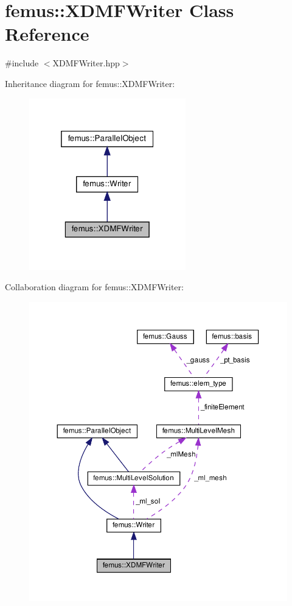\hypertarget{classfemus_1_1_x_d_m_f_writer}{}\section{femus\+:\+:X\+D\+M\+F\+Writer Class Reference}
\label{classfemus_1_1_x_d_m_f_writer}


{\ttfamily \#include $<$X\+D\+M\+F\+Writer.\+hpp$>$}



Inheritance diagram for femus\+:\+:X\+D\+M\+F\+Writer\+:
\nopagebreak
\begin{figure}[H]
\begin{center}
\leavevmode
\includegraphics[width=193pt]{classfemus_1_1_x_d_m_f_writer__inherit__graph}
\end{center}
\end{figure}


Collaboration diagram for femus\+:\+:X\+D\+M\+F\+Writer\+:
\nopagebreak
\begin{figure}[H]
\begin{center}
\leavevmode
\includegraphics[width=350pt]{classfemus_1_1_x_d_m_f_writer__coll__graph}
\end{center}
\end{figure}
